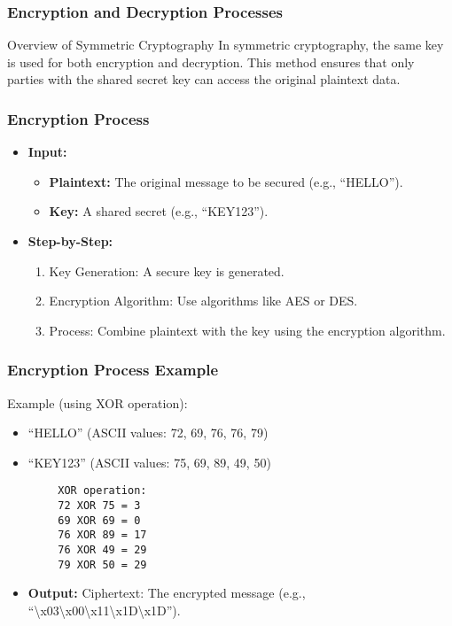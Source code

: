 \documentclass{beamer}
\begin{document}
\begin{frame}
    \frametitle{Encryption and Decryption Processes}
    \begin{block}{Overview of Symmetric Cryptography}
        In symmetric cryptography, the same key is used for both encryption and decryption. This method ensures that only parties with the shared secret key can access the original plaintext data.
    \end{block}
\end{frame}

\begin{frame}
    \frametitle{Encryption Process}
    \begin{itemize}
        \item \textbf{Input:}
        \begin{itemize}
            \item \textbf{Plaintext:} The original message to be secured (e.g., “HELLO”).
            \item \textbf{Key:} A shared secret (e.g., “KEY123”).
        \end{itemize}
        
        \item \textbf{Step-by-Step:}
        \begin{enumerate}
            \item Key Generation: A secure key is generated.
            \item Encryption Algorithm: Use algorithms like AES or DES.
            \item Process: Combine plaintext with the key using the encryption algorithm.
        \end{enumerate}
    \end{itemize}
\end{frame}

\begin{frame}[fragile]
    \frametitle{Encryption Process Example}
    \begin{block}{Example (using XOR operation):}
        \begin{itemize}
            \item “HELLO” (ASCII values: 72, 69, 76, 76, 79)
            \item “KEY123” (ASCII values: 75, 69, 89, 49, 50)
        \end{itemize}
        \begin{lstlisting}
        XOR operation:
        72 XOR 75 = 3
        69 XOR 69 = 0
        76 XOR 89 = 17
        76 XOR 49 = 29
        79 XOR 50 = 29
        \end{lstlisting}
        \begin{itemize}
            \item \textbf{Output:} Ciphertext: The encrypted message (e.g., “\textbackslash x03\textbackslash x00\textbackslash x11\textbackslash x1D\textbackslash x1D”).
        \end{itemize}
    \end{block}
\end{frame}
\end{document}
